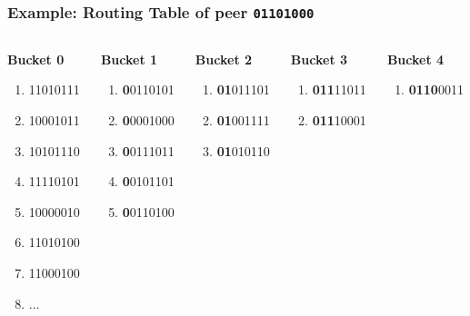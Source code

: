 \documentclass{pl-slide}
\begin{document}
\begin{frame}
\frametitle{Example: Routing Table of peer \texttt{01101000}}
\begin{columns}[onlytextwidth,t]
\begin{column}{0.19\textwidth}
	\textbf{Bucket 0}
   	\begin{enumerate}
   		\item 11010111
   		\item 10001011
   		\item 10101110
   		\item 11110101
   		\item 10000010
   		\item 11010100
   		\item 11000100
   		\item ...
   	\end{enumerate}
\end{column}
\begin{column}{0.19\textwidth}
	\textbf{Bucket 1}
   \begin{enumerate}
   		\item \textbf{0}0110101
   		\item \textbf{0}0001000
   		\item \textbf{0}0111011
   		\item \textbf{0}0101101
   		\item \textbf{0}0110100
   \end{enumerate}
\end{column}
\begin{column}{0.19\textwidth}
	\textbf{Bucket 2}
   \begin{enumerate}
   		\item \textbf{01}011101
   		\item \textbf{01}001111
   		\item \textbf{01}010110
   \end{enumerate}
\end{column}
\begin{column}{0.19\textwidth}
	\textbf{Bucket 3}
   \begin{enumerate}
   		\item \textbf{011}11011
   		\item \textbf{011}10001
   \end{enumerate}
\end{column}
\begin{column}{0.19\textwidth}
	\textbf{Bucket 4}
   	\begin{enumerate}
   		\item \textbf{0110}0011
   \end{enumerate}
\end{column}
\end{columns}
\end{frame}
\end{document}
